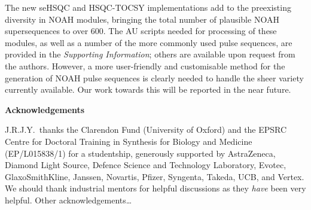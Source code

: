 \documentclass[11pt]{article}
\newcommand*{\hl}[1]{\textcolor{WildStrawberry}{#1}}
\newcommand*{\SInf}{\textit{Supporting Information}}
\begin{document}

The new seHSQC and HSQC-TOCSY implementations add to the preexisting diversity in NOAH modules, bringing the total number of plausible NOAH supersequences to over 600.
The AU scripts needed for processing of these modules, as well as a number of the more commonly used pulse sequences, are provided in the \SInf{}; others are available upon request from the authors.
However, a more user-friendly and customisable method for the generation of NOAH pulse sequences is clearly needed to handle the sheer variety currently available.
Our work towards this will be reported in the near future.



\textbf{\Large Acknowledgements}

J.R.J.Y.\ thanks the Clarendon Fund (University of Oxford) and the EPSRC Centre for Doctoral Training in Synthesis for Biology and Medicine (EP/L015838/1) for a studentship, generously supported by AstraZeneca, Diamond Light Source, Defence Science and Technology Laboratory, Evotec, GlaxoSmithKline, Janssen, Novartis, Pfizer, Syngenta, Takeda, UCB, and Vertex.
\hl{We should thank industrial mentors for helpful discussions as they \textit{have} been very helpful.}
\hl{Other acknowledgements\ldots}

\printbibliography

\end{document}
